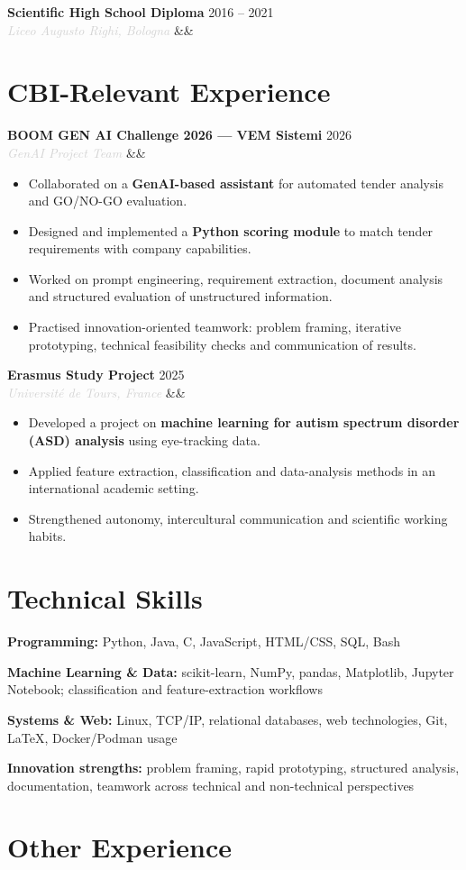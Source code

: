 \documentclass[a4paper,10pt]{article}
\newcommand{\entry}[4]{%
  \noindent\textbf{#1} \hfill \textcolor{accent}{#2}\\
  \textit{\textcolor{lightgray}{#3}}%
  \ifx&#4&\else\\\vspace{0.2em}#4\fi
  \vspace{0.5em}
}
\newcommand{\entrylist}[5]{%
  \noindent\textbf{#1} \hfill \textcolor{accent}{#2}\\
  \textit{\textcolor{lightgray}{#3}}%
  \ifx&#4&\else\\\vspace{0.2em}#4\fi
  \vspace{0.25em}
  \begin{itemize}#5\end{itemize}
  \vspace{0.25em}
}
\newcommand{\skillgroup}[2]{%
  \noindent\textbf{#1:} #2\par\vspace{0.3em}
}
\begin{document}
\entry{Scientific High School Diploma}{2016 -- 2021}{Liceo Augusto Righi, Bologna}{}

\section{CBI-Relevant Experience}

\entrylist{BOOM GEN AI Challenge 2026 — VEM Sistemi}{2026}{GenAI Project Team}{}{
  \item Collaborated on a \textbf{GenAI-based assistant} for automated tender analysis and GO/NO-GO evaluation.
  \item Designed and implemented a \textbf{Python scoring module} to match tender requirements with company capabilities.
  \item Worked on prompt engineering, requirement extraction, document analysis and structured evaluation of unstructured information.
  \item Practised innovation-oriented teamwork: problem framing, iterative prototyping, technical feasibility checks and communication of results.
}

\entrylist{Erasmus Study Project}{2025}{Université de Tours, France}{}{
  \item Developed a project on \textbf{machine learning for autism spectrum disorder (ASD) analysis} using eye-tracking data.
  \item Applied feature extraction, classification and data-analysis methods in an international academic setting.
  \item Strengthened autonomy, intercultural communication and scientific working habits.
}

\section{Technical Skills}

\skillgroup{Programming}{Python, Java, C, JavaScript, HTML/CSS, SQL, Bash}
\skillgroup{Machine Learning \& Data}{scikit-learn, NumPy, pandas, Matplotlib, Jupyter Notebook; classification and feature-extraction workflows}
\skillgroup{Systems \& Web}{Linux, TCP/IP, relational databases, web technologies, Git, \LaTeX, Docker/Podman usage}
\skillgroup{Innovation strengths}{problem framing, rapid prototyping, structured analysis, documentation, teamwork across technical and non-technical perspectives}

\section{Other Experience}
\end{document}
